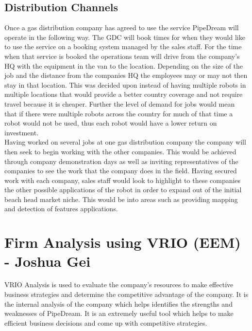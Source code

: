 \documentclass[11pt]{article}		%
\begin{document}
        \subsection{Distribution Channels}
	        
	       Once a gas distribution company has agreed to use the service PipeDream will operate in the following way.
	       The GDC will book times for when they would like to use the service on a booking system  managed by the sales staff. For the time when that service is booked the operations team will drive from the company’s HQ with the equipment in the van to the location. Depending on the size of the job and the distance from the companies HQ the employees may or may not then stay in that location. This was decided upon instead of having multiple robots in multiple locations that would provide a better country coverage and not require travel because it is cheaper. Further the level of demand for jobs would mean that if there were multiple robots across the country for much of that time a robot would not be used, thus each robot would have a lower return on investment.
	       \\
            Having worked on several jobs at one gas distribution company the company will then seek to begin working with the other companies. This would be achieved through company demonstration days as well as inviting representatives of the companies to see the work that the company does in the field. Having secured work with each company, sales staff would look to highlight to these companies the other possible applications of the robot in order to expand out of the initial beach head market niche. This would be into areas such as providing mapping and detection of features applications.
            
	\section[Firm Analysis using VRIO - EEM]{Firm Analysis using VRIO (EEM) - Joshua Gei}
	VRIO Analysis is used to evaluate the company’s resources to make effective business strategies and determine the competitive advantage of the company. It is the internal analysis of the company which
    helps identifies the strengths and weaknesses of PipeDream. It is an extremely useful tool which helps to make efficient business decisions and come up with competitive strategies.
	
\end{document}

